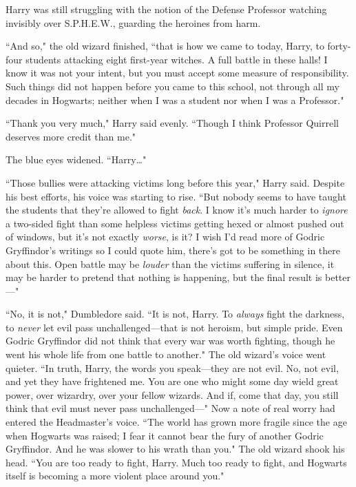Harry was still struggling with the notion of the Defense Professor watching invisibly over S.P.H.E.W., guarding the heroines from harm.

``And so," the old wizard finished, ``that is how we came to today, Harry, to forty-four students attacking eight first-year witches. A full battle in these halls! I know it was not your intent, but you must accept some measure of responsibility. Such things did not happen before you came to this school, not through all my decades in Hogwarts; neither when I was a student nor when I was a Professor."

``Thank you very much," Harry said evenly. ``Though I think Professor Quirrell deserves more credit than me."

The blue eyes widened. ``Harry{\ldots}"

``Those bullies were attacking victims long before this year," Harry said. Despite his best efforts, his voice was starting to rise. ``But nobody seems to have taught the students that they're allowed to fight \emph{back}. I know it's much harder to \emph{ignore} a two-sided fight than some helpless victims getting hexed or almost pushed out of windows, but it's not exactly \emph{worse}, is it? I wish I'd read more of Godric Gryffindor's writings so I could quote him, there's got to be something in there about this. Open battle may be \emph{louder} than the victims suffering in silence, it may be harder to pretend that nothing is happening, but the final result is better—"

``No, it is not," Dumbledore said. ``It is not, Harry. To \emph{always} fight the darkness, to \emph{never} let evil pass unchallenged—that is not heroism, but simple pride. Even Godric Gryffindor did not think that every war was worth fighting, though he went his whole life from one battle to another." The old wizard's voice went quieter. ``In truth, Harry, the words you speak—they are not evil. No, not evil, and yet they have frightened me. You are one who might some day wield great power, over wizardry, over your fellow wizards. And if, come that day, you still think that evil must never pass unchallenged—" Now a note of real worry had entered the Headmaster's voice. ``The world has grown more fragile since the age when Hogwarts was raised; I fear it cannot bear the fury of another Godric Gryffindor. And he was slower to his wrath than you." The old wizard shook his head. ``You are too ready to fight, Harry. Much too ready to fight, and Hogwarts itself is becoming a more violent place around you."

